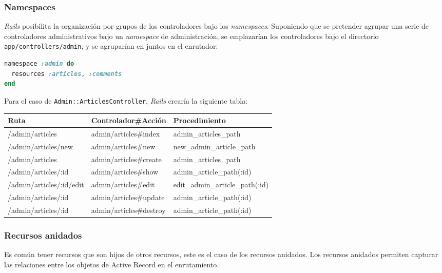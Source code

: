 \subsubsection{Namespaces}
\textit{Rails} posibilita la organización por grupos de los controladores bajo los \textit{namespaces}. Suponiendo que se pretender agrupar una serie de controladores administrativos bajo un \textit{namespace} de administración, se emplazarían los controladores bajo el directorio \texttt{app/controllers/admin}, y se agruparían en juntos en el enrutador:

\begin{lstlisting}[language=Ruby]
namespace :admin do
  resources :articles, :comments
end
\end{lstlisting}

Para el caso de \texttt{Admin::ArticlesController}, \textit{Rails} crearía la siguiente tabla:

\begin{center}
	\scalebox{0.87} {
	\begin{tabular}{| p{4.5cm} | p{4.5cm} | p{5cm} | }
	\hline
	Ruta & Controlador\#Acción & Procedimiento \\ \hline
	/admin/articles & admin/articles\#index & admin\_articles\_path \\
	/admin/articles/new & admin/articles\#new & new\_admin\_article\_path \\
	/admin/articles & admin/articles\#create & admin\_articles\_path \\
	/admin/articles/:id & admin/articles\#show & admin\_article\_path(:id) \\
	/admin/articles/:id/edit & admin/articles\#edit & edit\_admin\_article\_path(:id) \\
	/admin/articles/:id & admin/articles\#update & admin\_article\_path(:id) \\
	/admin/articles/:id	& admin/articles\#destroy & admin\_article\_path(:id) \\  
	\hline
	\end{tabular}
	}
\end{center}
 
 
\subsubsection{Recursos anidados}
Es común tener recursos que son hijos de otros recursos, este es el caso de los recursos anidados. Los recursos anidados permiten capturar las relaciones entre los objetos de Active Record en el enrutamiento.

